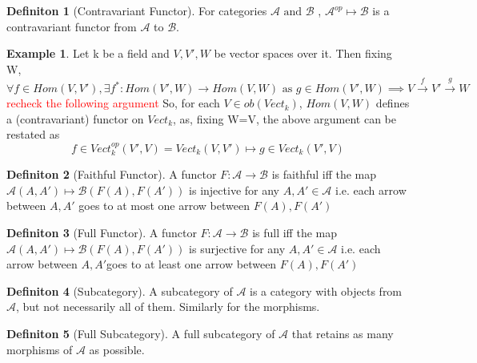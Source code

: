 \documentclass{article}
\theoremstyle{definition}
\newtheorem{example}{Example}[section]
\theoremstyle{definition}
\newtheorem{definition}{Definiton}[section]
\theoremstyle{definition}
\theoremstyle{definition}
\begin{document}
\begin{definition}[Contravariant Functor] %
	For categories $ \mathcal{A} \text{ and }\mathcal{B}  $ , $ \mathcal{A} ^{op} \mapsto \mathcal{B} $ is a contravariant functor from $ \mathcal{A}  $ to $ \mathcal{B}  $.
\end{definition}
\begin{example}
	Let k be a field and $ V,V',W $ be vector spaces over it. Then fixing W,
	\[ \forall f \in Hom(V,V'), \exists f^*:Hom(V',W) \rightarrow Hom(V,W) \text{ as } g \in Hom(V',W) \implies V \xrightarrow{f}V'\xrightarrow{g}W  \]
	\textcolor{red}{recheck the following argument}
	So, for each $ V \in ob(Vect_k)$, $ Hom(V,W) $ defines a (contravariant) functor on $ Vect_k $, as, fixing W=V, the above argument can be restated as
	\[ f \in Vect_k^{op}(V',V)=Vect_k(V,V') \mapsto g \in Vect_k(V',V)   \]
\end{example}

\begin{definition}[Faithful Functor] %
	A functor $ F:\mathcal{A}  \rightarrow \mathcal{B} $ is faithful iff the map$ \mathcal{A} (A,A') \mapsto \mathcal{B}(F(A),F(A'))$ is injective for any $ A,A' \in \mathcal{A} $ i.e. each arrow between $ A,A' $ goes to at most one arrow between $ F(A),F(A') $
\end{definition}
\begin{definition}[Full Functor] %
	A functor $ F:\mathcal{A}  \rightarrow \mathcal{B} $ is full iff the map$ \mathcal{A} (A,A') \mapsto \mathcal{B}(F(A),F(A'))$ is surjective for any $ A,A' \in \mathcal{A} $ i.e. each arrow between $  A,A' $goes to at least one arrow between $ F(A),F(A') $
\end{definition}

\begin{definition}[Subcategory] %
	A subcategory of $ \mathcal{A}  $ is a category with objects from $ \mathcal{A} $, but not necessarily all of them. Similarly for the morphisms.
\end{definition}

\begin{definition}[Full Subcategory] %
	A full subcategory of $ \mathcal{A} $ that retains as many morphisms of $ \mathcal{A} $ as possible.
\end{definition}
\end{document}
